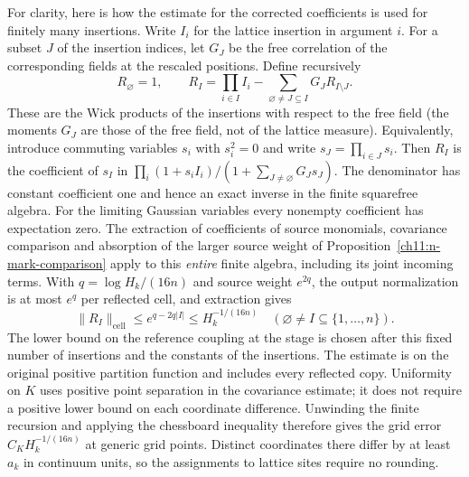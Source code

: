 For clarity, here is how the estimate for the corrected coefficients is used for finitely many insertions. Write $I_i$ for the lattice insertion in argument $i$. For a subset
$J$ of the insertion indices, let $G_J$ be the free correlation of the
corresponding fields at the rescaled positions. Define recursively
\[
 R_\varnothing=1,\qquad
 R_I=\prod_{i\in I}I_i-
          \sum_{\varnothing\ne J\subseteq I}G_JR_{I\setminus J}.
\]
These are the Wick products of the insertions with respect to the free field (the moments $G_J$ are those of the free field, not of the lattice measure).
Equivalently, introduce commuting variables $s_i$ with $s_i^2=0$ and write
$s_J=\prod_{i\in J}s_i$. Then $R_I$ is the coefficient of $s_I$ in
$\prod_i(1+s_i I_i)/(1+\sum_{J\ne\varnothing}G_Js_J)$. The denominator has
constant coefficient one and hence an exact inverse in the finite
squarefree algebra. For the limiting Gaussian variables every
nonempty coefficient has expectation zero. The extraction of coefficients of source monomials,
covariance comparison and absorption of the larger source weight of
Proposition~\ref{ch11:n-mark-comparison} apply to this \emph{entire}
finite algebra, including its joint incoming terms.
With $q=\log H_k/(16n)$ and source weight $e^{2q}$, the output
normalization is at most $e^q$ per reflected cell, and extraction gives
\begin{equation}
 \|R_I\|_{\mathrm{cell}}
       \le e^{q-2q|I|}\le H_k^{-1/(16n)}
       \quad(\varnothing\ne I\subseteq\{1,\ldots,n\}).
 \label{ch14:subset-root}
\end{equation}
The lower bound on the reference coupling at the stage is chosen after this fixed number of insertions and the constants of the
insertions. The estimate is on the original positive partition
function and includes every reflected copy. Uniformity on $K$ uses
positive point separation in the covariance estimate; it does not
require a positive lower bound on each coordinate difference.
Unwinding the finite recursion and applying the chessboard inequality
therefore gives the grid error $C_KH_k^{-1/(16n)}$ at generic grid
points. Distinct coordinates there differ by at least $a_k$ in continuum
units, so the assignments to lattice sites require no rounding.

